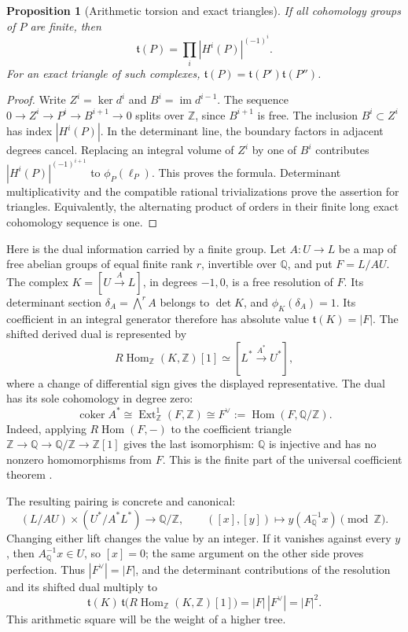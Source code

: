 \documentclass[11pt]{article}
\newtheorem{proposition}[theorem]{Proposition}
\theoremstyle{definition}
\theoremstyle{remark}
\newcommand{\Q}{\mathbb Q}
\newcommand{\Z}{\mathbb Z}
\begin{document}
\begin{proposition}[Arithmetic torsion and exact triangles]
\label{prop:derived-arithmetic-torsion}
If all cohomology groups of \(P\) are finite, then
\begin{equation}\label{eq:derived-torsion-product}
 \mathfrak t(P)=\prod_i|H^i(P)|^{(-1)^i}.
\end{equation}
For an exact triangle of such complexes,
\(\mathfrak t(P)=\mathfrak t(P')\mathfrak t(P'')\).
\end{proposition}
\begin{proof}
Write \(Z^i=\ker d^i\) and \(B^i=\operatorname{im}d^{i-1}\).
The sequence \(0\to Z^i\to P^i\to B^{i+1}\to0\) splits over \(\Z\),
since \(B^{i+1}\) is free. The inclusion \(B^i\subset Z^i\) has index
\(|H^i(P)|\). In the determinant line, the boundary factors in adjacent
degrees cancel. Replacing an integral volume of \(Z^i\) by one of
\(B^i\) contributes \(|H^i(P)|^{(-1)^{i+1}}\) to
\(\phi_P(\ell_P)\). This proves the formula. Determinant multiplicativity
and the compatible rational trivializations prove the assertion for
triangles. Equivalently, the alternating product of orders in their
finite long exact cohomology sequence is one.
\end{proof}

Here is the dual information carried by a finite group. Let
\(A:U\to L\) be a map of free abelian groups of equal finite rank \(r\), invertible
over \(\Q\), and put \(F=L/AU\). The complex
\(K=[U\xrightarrow{A}L]\), in degrees \(-1,0\), is a free resolution
of \(F\). Its determinant section \(\delta_A=\bigwedge^r A\) belongs
to \(\det K\), and \(\phi_K(\delta_A)=1\). Its coefficient in an
integral generator therefore has absolute value
\(\mathfrak t(K)=|F|\). The shifted derived dual is represented by
\[
 R\operatorname{Hom}_{\Z}(K,\Z)[1]
 \simeq[L^*\xrightarrow{A^*}U^*],
\]
where a change of differential sign gives the displayed representative.
The dual has its sole cohomology in degree zero:
\begin{equation}\label{eq:derived-finite-dual}
 \operatorname{coker}A^*
 \cong\operatorname{Ext}^1_{\Z}(F,\Z)
 \cong F^\vee:=\operatorname{Hom}(F,\Q/\Z).
\end{equation}
Indeed, applying \(R\operatorname{Hom}(F,-)\) to the coefficient
triangle \(\Z\to\Q\to\Q/\Z\to\Z[1]\) gives the last isomorphism:
\(\Q\) is injective and has no nonzero homomorphisms from \(F\).
This is the finite part of the universal coefficient theorem
\cite{derived-hatcher-uct}.

The resulting pairing is concrete and canonical:
\[
 (L/AU)\times(U^*/A^*L^*)\longrightarrow\Q/\Z,
 \qquad ([x],[y])\longmapsto y(A_{\Q}^{-1}x)\pmod\Z.
\]
Changing either lift changes the value by an integer. If it vanishes
against every \(y\), then \(A_{\Q}^{-1}x\in U\), so \([x]=0\);
the same argument on the other side proves perfection. Thus
\(|F^\vee|=|F|\), and the determinant contributions of the resolution
and its shifted dual multiply to
\begin{equation}\label{eq:derived-torsion-square}
 \mathfrak t(K)\,
 \mathfrak t\bigl(R\operatorname{Hom}_{\Z}(K,\Z)[1]\bigr)
   =|F|\,|F^\vee|=|F|^2.
\end{equation}
This arithmetic square will be the weight of a higher tree.
\end{document}
